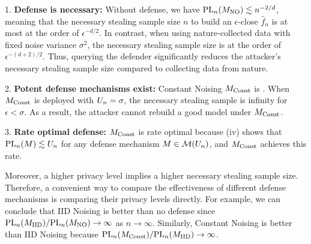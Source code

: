         1. \textbf{Defense is necessary:} Without defense, we have $\textrm{PL}_n(M_{\textrm{NO}}) \lesssim n^{-2/d}$, meaning that the necessary stealing sample size $n$ to build an $\epsilon$-close $\hat{f}_n$ is at most at the order of $\epsilon^{-d/2}$. In contrast, when using nature-collected data with fixed noise variance $\sigma^2$, the necessary stealing sample size is at the order of $\epsilon^{-(d+2)/2}$. 
        Thus, querying the defender significantly reduces the attacker's necessary stealing sample size compared to collecting data from nature.
        
        2. \textbf{Potent defense mechanisms exist:} Constant Noising $M_{\textrm{Const}}$ is \eco. When $M_{\textrm{Const}}$ is deployed with $U_n = \sigma$, the necessary stealing sample is infinity for $\epsilon < \sigma$. As a result, the attacker cannot rebuild a good model under $M_{\textrm{Const}}$. 

        3. \textbf{Rate optimal defense:} $M_{\textrm{Const}}$ is rate optimal because (iv) shows that $\textrm{PL}_n(M) \lesssim U_n$ for any defense mechanism $M \in \mathcal{M}(U_n)$, and $M_{\textrm{Const}}$ achieves this rate.

        Moreover, a higher privacy level implies a higher necessary stealing sample size. Therefore, a convenient way to compare the effectiveness of different defense mechanisms is comparing their privacy levels directly. For example, we can conclude that IID Noising is better than no defense since $\textrm{PL}_n(M_{\textrm{IID}})/\textrm{PL}_n(M_{\textrm{NO}}) \to \infty$ as $n \to \infty$. Similarly, Constant Noising is better than IID Noising because $\textrm{PL}_n(M_{\textrm{Const}})/\textrm{PL}_n(M_{\textrm{IID}}) \to \infty$. 
 

        
        
    \def\preg{\textrm{poly}}
